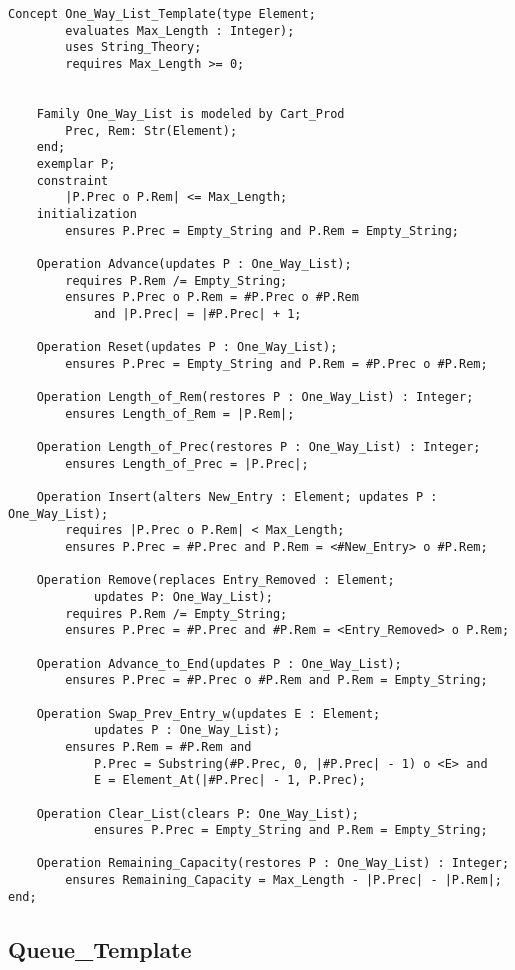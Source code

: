 \begin{lstlisting}[language=resolve]
Concept One_Way_List_Template(type Element;
		evaluates Max_Length : Integer);
		uses String_Theory;
		requires Max_Length >= 0;
		

	Family One_Way_List is modeled by Cart_Prod
		Prec, Rem: Str(Element);
	end;
	exemplar P;
	constraint
		|P.Prec o P.Rem| <= Max_Length;
	initialization
		ensures P.Prec = Empty_String and P.Rem = Empty_String;

	Operation Advance(updates P : One_Way_List);
		requires P.Rem /= Empty_String;
		ensures P.Prec o P.Rem = #P.Prec o #P.Rem 
			and |P.Prec| = |#P.Prec| + 1;

	Operation Reset(updates P : One_Way_List);
		ensures P.Prec = Empty_String and P.Rem = #P.Prec o #P.Rem;

	Operation Length_of_Rem(restores P : One_Way_List) : Integer;
		ensures Length_of_Rem = |P.Rem|;

	Operation Length_of_Prec(restores P : One_Way_List) : Integer;
		ensures Length_of_Prec = |P.Prec|;

	Operation Insert(alters New_Entry : Element; updates P : One_Way_List);
		requires |P.Prec o P.Rem| < Max_Length;
		ensures P.Prec = #P.Prec and P.Rem = <#New_Entry> o #P.Rem;

	Operation Remove(replaces Entry_Removed : Element; 
			updates P: One_Way_List);
		requires P.Rem /= Empty_String;
		ensures P.Prec = #P.Prec and #P.Rem = <Entry_Removed> o P.Rem;

	Operation Advance_to_End(updates P : One_Way_List);
		ensures P.Prec = #P.Prec o #P.Rem and P.Rem = Empty_String;

	Operation Swap_Prev_Entry_w(updates E : Element; 
			updates P : One_Way_List);
		ensures P.Rem = #P.Rem and 
			P.Prec = Substring(#P.Prec, 0, |#P.Prec| - 1) o <E> and
			E = Element_At(|#P.Prec| - 1, P.Prec);
	
	Operation Clear_List(clears P: One_Way_List);
			ensures P.Prec = Empty_String and P.Rem = Empty_String;

	Operation Remaining_Capacity(restores P : One_Way_List) : Integer;
		ensures Remaining_Capacity = Max_Length - |P.Prec| - |P.Rem|;
end;
\end{lstlisting}

	\subsection{Queue\_Template}	%

